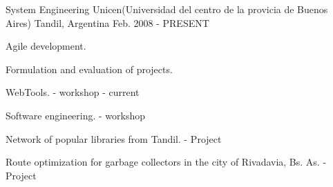 


\begin{cventries}


\cventry
{System Engineering} %
{Unicen(Universidad del centro de la provicia de Buenos Aires)} %
{Tandil, Argentina} %
{Feb. 2008 - PRESENT} %
{ %
\begin{cvitems}
\item {Agile development.}
\item {Formulation and evaluation of projects.}
\item {WebTools. - workshop - current}
\item {Software engineering. - workshop}
\item {Network of popular libraries from Tandil. - Project}
\item {Route optimization for garbage collectors in the city of Rivadavia, Bs. As. - Project}
\end{cvitems}
}


\end{cventries}
